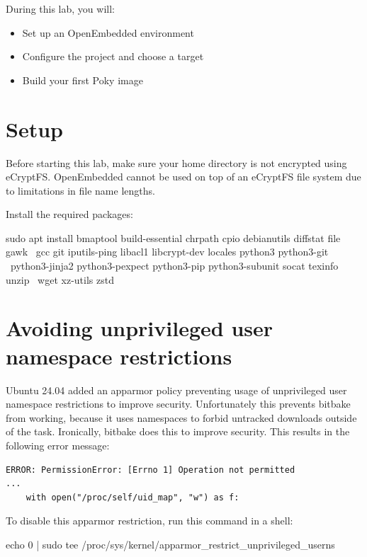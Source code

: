 
During this lab, you will:
\begin{itemize}
  \item Set up an OpenEmbedded environment
  \item Configure the project and choose a target
  \item Build your first Poky image
\end{itemize}

\section{Setup}

Before starting this lab, make sure your home directory is not
encrypted using eCryptFS. OpenEmbedded cannot be used on top of an eCryptFS file
system due to limitations in file name lengths.

Install the required packages:
\begin{bashinput}
sudo apt install bmaptool build-essential chrpath cpio debianutils diffstat file gawk \
	gcc git iputils-ping libacl1 libcrypt-dev locales python3 python3-git \
	python3-jinja2 python3-pexpect python3-pip python3-subunit socat texinfo unzip \
	wget xz-utils zstd
\end{bashinput}

\section{Avoiding unprivileged user namespace restrictions}

Ubuntu 24.04 added an apparmor policy preventing usage of unprivileged user
namespace restrictions to improve security. Unfortunately this prevents
bitbake from working, because it uses namespaces to forbid untracked
downloads outside of the \code{do_fetch} task. Ironically, bitbake does
this to improve security. This results in the following error message:

\begin{verbatim}
ERROR: PermissionError: [Errno 1] Operation not permitted
...
    with open("/proc/self/uid_map", "w") as f:
\end{verbatim}

To disable this apparmor restriction, run this command in a shell:

\begin{bashinput}
echo 0 | sudo tee /proc/sys/kernel/apparmor_restrict_unprivileged_userns
\end{bashinput}

